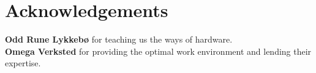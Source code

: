 

\section{Acknowledgements}
\textbf{Odd Rune Lykkebø} for teaching us the ways of hardware.\\
\textbf{Omega Verksted} for providing the optimal work environment and lending their expertise. 


